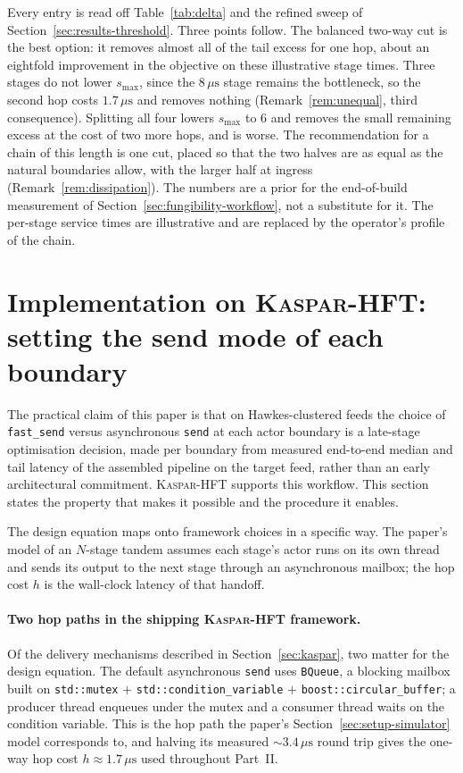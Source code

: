 \documentclass[11pt]{article}
\newcommand{\kasparhft}{\textsc{Kaspar-HFT}}
\begin{document}
Every entry is read off Table~\ref{tab:delta} and the refined sweep of
Section~\ref{sec:results-threshold}. Three points follow. The balanced two-way cut is the
best option: it removes almost all of the tail excess for one hop, about an eightfold
improvement in the objective on these illustrative stage times. Three stages do not lower $s_{\max}$, since the $8\,\mu\mathrm{s}$ stage
remains the bottleneck, so the second hop costs $1.7\,\mu\mathrm{s}$ and removes nothing
(Remark~\ref{rem:unequal}, third consequence). Splitting all four lowers $s_{\max}$ to $6$
and removes the small remaining excess at the cost of two more hops, and is worse. The recommendation for a chain of this length is one cut, placed so that the two
halves are as equal as the natural boundaries allow, with the larger half at ingress
(Remark~\ref{rem:dissipation}). The numbers are a prior for the end-of-build measurement
of Section~\ref{sec:fungibility-workflow}, not a substitute for it. The per-stage service
times are illustrative and are replaced by the operator's profile of the chain.

\section{Implementation on \kasparhft{}: setting the send mode of each boundary}
\label{sec:implementation}
\label{sec:fungibility}

The practical claim of this paper is that on Hawkes-clustered feeds the choice of
\texttt{fast\_send} versus asynchronous \texttt{send} at each actor boundary is a
late-stage optimisation decision, made per boundary from measured end-to-end median and
tail latency of the assembled pipeline on the target feed, rather than an early
architectural commitment. \kasparhft{} supports this workflow. This section states the
property that makes it possible and the procedure it enables.

The design equation maps onto framework choices in a specific way. The paper's model of an
$N$-stage tandem assumes each stage's actor runs on its own thread and sends its output to
the next stage through an asynchronous mailbox; the hop cost $h$ is the wall-clock
latency of that handoff.

\paragraph{Two hop paths in the shipping \kasparhft{} framework.} Of the delivery
mechanisms described in Section~\ref{sec:kaspar}, two matter for the design equation. The
default asynchronous \texttt{send} uses \texttt{BQueue}, a blocking mailbox built on
\texttt{std::mutex} $+$ \texttt{std::condition\_variable} $+$
\texttt{boost::circular\_buffer}; a producer thread enqueues under the mutex and a
consumer thread waits on the condition variable. This is the hop path the paper's
Section~\ref{sec:setup-simulator} model corresponds to, and halving its measured $\sim
3.4\,\mu\mathrm{s}$ round trip gives the one-way hop cost $h \approx 1.7\,\mu\mathrm{s}$
used throughout Part~II.
\end{document}
